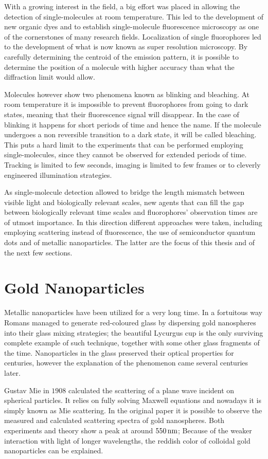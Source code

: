 With a growing interest in the field, a big effort was placed in allowing the
detection of single-molecules at room temperature. This led to the development
of new organic dyes and to establish single-molecule fluorescence microscopy as
one of the cornerstones of many research fields. Localization of single
fluorophores led to the development of what is now known as super resolution
microscopy. By carefully determining the centroid of the emission pattern, it is
possible to determine the position of a molecule with higher accuracy than what
the diffraction limit would allow. 

Molecules however show two phenomena known as blinking and bleaching. At room
temperature it is impossible to prevent fluorophores from going to dark states,
meaning that their fluorescence signal will disappear. In the case of blinking
it happens for short periods of time and hence the name. If the molecule
undergoes a non reversible transition to a dark state, it will be called
bleaching. This puts a hard limit to the experiments that can be performed
employing single-molecules, since they cannot be observed for extended periods
of time. Tracking is limited to few seconds, imaging is limited to few frames or
to cleverly engineered illumination strategies.

As single-molecule detection allowed to bridge the length mismatch between
visible light and biologically relevant scales, new agents that can fill the gap
between biologically relevant time scales and fluorophores' observation times
are of utmost importance. In this direction different approaches were taken,
including employing scattering instead of fluorescence, the use of semiconductor
quantum dots and of metallic nanoparticles. The latter are the focus of this
thesis and of the next few sections. 

\section{Gold Nanoparticles}
Metallic nanoparticles have been utilized for a very long time. In a fortuitous
way Romans managed to generate red-coloured glass by dispersing gold nanospheres
into their glass mixing strategies; the beautiful Lycurgus cup is the only
surviving complete example of such technique, together with some other glass
fragments of the time. Nanoparticles in the glass preserved their optical
properties for centuries, however the explanation of the phenomenon came several
centuries later.

Gustav Mie in $1908$ calculated the scattering of a plane wave incident on
spherical particles. It relies on fully solving Maxwell equations and nowadays
it is simply known as Mie scattering. In the original paper it is possible to
observe the measured and calculated scattering spectra of gold nanospheres. Both
experiments and theory show a peak at around $550\,\textrm{nm}$; Because of the weaker
interaction with light of longer wavelengths, the reddish color of colloidal
gold nanoparticles can be explained. 

